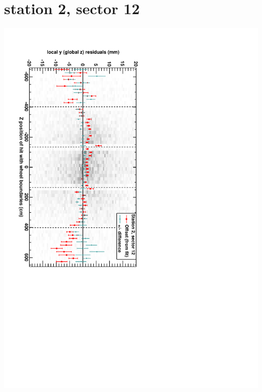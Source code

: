 \documentclass[compress]{beamer}
\begin{document}
\section*{station 2, sector 12}
\begin{frame} \vfill \mbox{\hspace{-1 cm}\includegraphics[height=1.2\linewidth, angle=90]{DTzVsZ_st2_sr12.pdf}} \end{frame}
\end{document}
